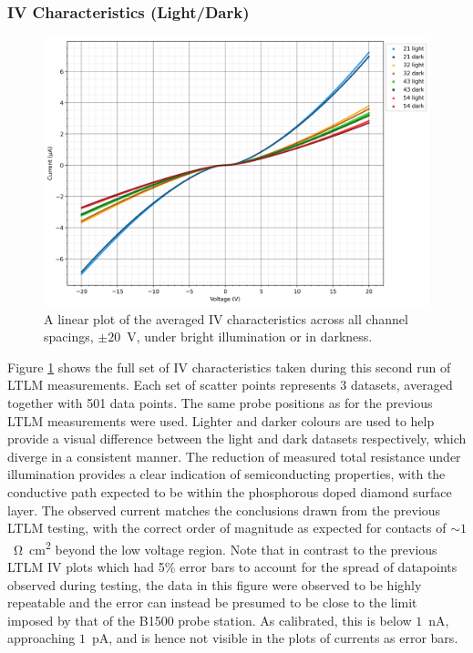 \begin{refsection}
\subsubsection{IV Characteristics (Light/Dark)}

\begin{figure}[H]
    \centering
    \includegraphics[width=\linewidth]{Chapter7/Figs/Raster/Lost Data/20V Combined IV Characteristics for All Conditions.png}
    \caption{A linear plot of the averaged IV characteristics across all channel spacings, $\pm20$~\si{\volt}, under bright illumination or in darkness.}
    \label{fig:lost_iv_20v}
\end{figure}

Figure \ref{fig:lost_iv_20v} shows the full set of IV characteristics taken during this second run of LTLM measurements. Each set of scatter points represents 3 datasets, averaged together with 501 data points. The same probe positions as for the previous LTLM measurements were used. Lighter and darker colours are used to help provide a visual difference between the light and dark datasets respectively, which diverge in a consistent manner. The reduction of measured total resistance under illumination provides a clear indication of semiconducting properties, with the conductive path expected to be within the phosphorous doped diamond surface layer. The observed current matches the conclusions drawn from the previous LTLM testing, with the correct order of magnitude as expected for contacts of $\sim1$~\si{\ohm\centi\metre\squared} beyond the low voltage region. Note that in contrast to the previous LTLM IV plots which had 5\% error bars to account for the spread of datapoints observed during testing, the data in this figure were observed to be highly repeatable and the error can instead be presumed to be close to the limit imposed by that of the B1500 probe station. As calibrated, this is below $1$~\si{\nano\ampere}, approaching $1$~\si{\pico\ampere}, and is hence not visible in the plots of currents as error bars.


\end{refsection}
